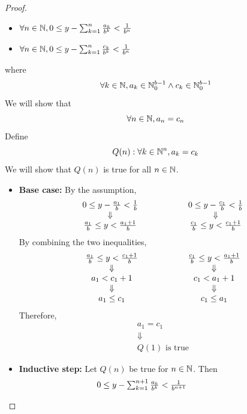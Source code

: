 \begin{proof}
    \begin{itemize}
        \item $\forall n \in \mathbb{N}, 0 \leq y - \sum_{k = 1}^{n} \frac{a_{k}}{b^{k}} < \frac{1}{b^{n}}$
        \item $\forall n \in \mathbb{N}, 0 \leq y - \sum_{k = 1}^{n} \frac{c_{k}}{b^{k}} < \frac{1}{b^{n}}$
    \end{itemize}
    where
    \[
    \forall k \in \mathbb{N}, a_{k} \in \mathbb{N}_{0}^{b - 1} \land c_{k} \in \mathbb{N}_{0}^{b - 1}
    \]
    We will show that
    \[
    \forall n \in \mathbb{N}, a_{n} = c_{n}
    \]
    Define
    \[
    Q(n): \forall k \in \mathbb{N}^{n}, a_{k} = c_{k}
    \]
    We will show that $Q(n)$ is true for all $n \in \mathbb{N}$.
    \begin{itemize}
        \item \textbf{Base case:} By the assumption,
        \[
        \begin{array}{c@{\qquad\qquad\qquad}c}
            0 \leq y - \frac{a_{1}}{b} < \frac{1}{b} & 0 \leq y - \frac{c_{1}}{b} < \frac{1}{b} \\
            \Downarrow & \Downarrow \\
            \frac{a_{1}}{b} \leq y < \frac{a_{1} + 1}{b} & \frac{c_{1}}{b} \leq y < \frac{c_{1} + 1}{b}
        \end{array}
        \]
        By combining the two inequalities,
        \[
        \begin{array}{c@{\qquad\qquad\qquad}c}
            \frac{a_{1}}{b} \leq y < \frac{c_{1} + 1}{b} & \frac{c_{1}}{b} \leq y < \frac{a_{1} + 1}{b} \\
            \Downarrow & \Downarrow \\
            a_{1} < c_{1} + 1 & c_{1} < a_{1} + 1 \\
            \Downarrow & \Downarrow \\
            a_{1} \leq c_{1} & c_{1} \leq a_{1}
        \end{array}
        \]
        Therefore,
        \[
        \begin{array}{c}
            a_{1} = c_{1} \\
            \Downarrow \\
            Q(1) \text{ is true}
        \end{array}
        \]
        \item \textbf{Inductive step:} Let $Q(n)$ be true for $n \in \mathbb{N}$. Then
        \[
        \begin{array}{c@{\qquad\quad\qquad}c}
            0 \leq y - \sum_{k = 1}^{n + 1} \frac{a_{k}}{b^{k}} < \frac{1}{b^{n + 1}} &

\end{array}\]
\end{itemize}
\end{proof}
